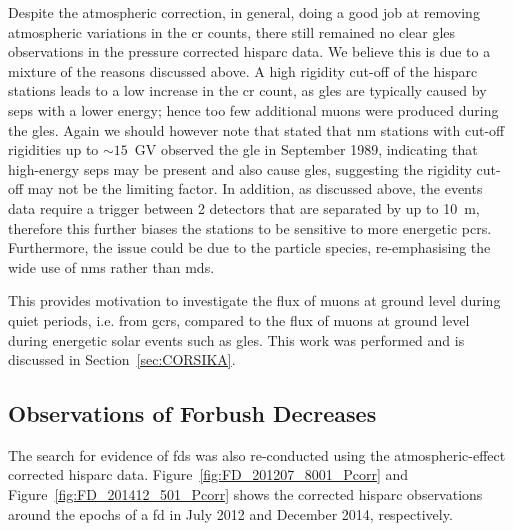Despite the atmospheric correction, in general, doing a good job at removing atmospheric variations in the \gls{cr} counts, there still remained no clear \glspl{gle} observations in the pressure corrected \gls{hisparc} data. We believe this is due to a mixture of the reasons discussed above. A high rigidity cut-off of the \gls{hisparc} stations leads to a low increase in the \gls{cr} count, as \glspl{gle} are typically caused by \glspl{sep} with a lower energy; hence too few additional muons were produced during the \glspl{gle}. Again we should however note that \citet{humble_j._e._detection_2012} stated that \gls{nm} stations with cut-off rigidities up to $\sim 15$~GV observed the \gls{gle} in September 1989, indicating that high-energy \glspl{sep} may be present and also cause \glspl{gle}, suggesting the rigidity cut-off may not be the limiting factor. In addition, as discussed above, the events data require a trigger between 2 detectors that are separated by up to 10~m, therefore this further biases the stations to be sensitive to more energetic \glspl{pcr}. Furthermore, the issue could be due to the particle species, re-emphasising the wide use of \glspl{nm} rather than \glspl{md}.

This provides motivation to investigate the flux of muons at ground level during quiet periods, i.e. from \glspl{gcr}, compared to the flux of muons at ground level during energetic solar events such as \glspl{gle}. This work was performed and is discussed in Section~\ref{sec:CORSIKA}.


\subsection{Observations of Forbush Decreases}

The search for evidence of \glspl{fd} was also re-conducted using the atmospheric-effect corrected \gls{hisparc} data. Figure~\ref{fig:FD_201207_8001_Pcorr} and Figure~\ref{fig:FD_201412_501_Pcorr} shows the corrected \gls{hisparc} observations around the epochs of a \gls{fd} in July 2012 and December 2014, respectively.

